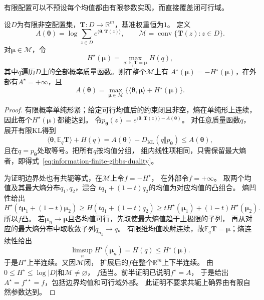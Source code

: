 有限配置可以不预设每个均值都由有限参数实现，而直接覆盖闭可行域。
\begin{theorem}[有限配置上的配分函数与最大熵对偶]
\label{thm:information-finite-entropy-duality}
设\(D\)为有限非空配置集，\(\bm T:D\to\mathbb R^m\)，基准权重恒为\(1\)。
定义
\[
  A(\bm\theta)=\log\sum_{z\in D}e^{\langle\bm\theta,\bm T(z)\rangle},
  \qquad\mathcal M=\operatorname{conv}\{\bm T(z):z\in D\}.
\]
对\(\bm\mu\in\mathcal M\)，令
\[
  H^\star(\bm\mu)=\max_{q:\,\mathbb E_q\bm T=\bm\mu}H(q),
\]
其中\(q\)遍历\(D\)上的全部概率质量函数。则在整个\(\mathcal M\)上有
\(A^\star(\bm\mu)=-H^\star(\bm\mu)\)，在外部有\(A^\star=+\infty\)，且
\begin{equation}
  A(\bm\theta)=\max_{\bm\mu\in\mathcal M}
  \{\langle\bm\theta,\bm\mu\rangle+H^\star(\bm\mu)\}.
  \label{eq:information-finite-gibbs-duality}
\end{equation}
\end{theorem}
\begin{proof}
有限概率单纯形紧；给定可行均值后的约束闭且非空，熵在单纯形上连续，
因此每个\(H^\star(\bm\mu)\)都能达到。
令\(p_{\bm\theta}(z)=e^{\langle\bm\theta,\bm T(z)\rangle-A(\bm\theta)}\)。
对任意质量函数\(q\)，展开有限KL得到
\[
  \langle\bm\theta,\mathbb E_q\bm T\rangle+H(q)
  =A(\bm\theta)-D_{\mathrm{KL}}(q\Vert p_{\bm\theta})
  \leq A(\bm\theta),
\]
且在\(q=p_{\bm\theta}\)处取等号。把所有\(q\)按均值分组，
组内线性项相同，只需保留最大熵者，即得式~\eqref{eq:information-finite-gibbs-duality}。

为证明边界处也有共轭等式，在\(\mathcal M\)上令\(f=-H^\star\)，
在外部令\(f=+\infty\)。
取两个均值及其最大熵分布\(q_1,q_2\)，混合
\(tq_1+(1-t)q_2\)的均值为对应均值的凸组合。
熵凹性给出
\[
  H^\star(t\bm\mu_1+(1-t)\bm\mu_2)
  \geq H(tq_1+(1-t)q_2)
  \geq tH^\star(\bm\mu_1)+(1-t)H^\star(\bm\mu_2).
\]
所以\(f\)凸。
若\(\bm\mu_n\to\bm\mu\)且各均值可行，先取使最大熵值趋于上极限的子列，
再从对应的最大熵分布中取收敛子列\(q_{n_k}\to q\)。
有限维均值映射连续，故\(\mathbb E_q\bm T=\bm\mu\)；熵连续性给出
\[
  \limsup_nH^\star(\bm\mu_n)=H(q)\leq H^\star(\bm\mu).
\]
于是\(H^\star\)上半连续。又因\(\mathcal M\)闭，
扩展后的\(f\)在整个\(\mathbb R^m\)上下半连续。
由\(0\leq H^\star\leq\log|D|\)和\(\mathcal M\neq\varnothing\)，
\(f\)适当。前半证明已说明\(f^\star=A\)，
于是给出
\(A^\star=f^{\star\star}=f\)，包括边界均值和可行域外部。
此证明不要求共轭上确界由有限自然参数达到。
\end{proof}


